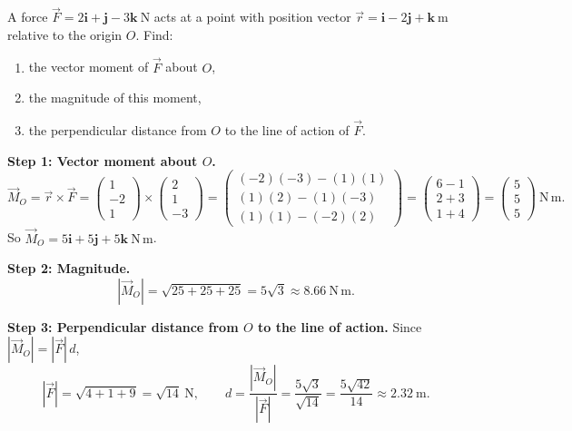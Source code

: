 \documentclass[11pt]{article}
\begin{document}
\begin{exoresolu}
A force $\vec{F} = 2\mathbf{i} + \mathbf{j} - 3\mathbf{k}\ \mathrm{N}$ acts at a point with position vector $\vec{r} = \mathbf{i} - 2\mathbf{j} + \mathbf{k}\ \mathrm{m}$ relative to the origin $O$. Find:
\begin{enumerate}
\item the vector moment of $\vec{F}$ about $O$,
\item the magnitude of this moment,
\item the perpendicular distance from $O$ to the line of action of $\vec{F}$.
\end{enumerate}
\tcblower
\textbf{Step 1: Vector moment about $O$.}
\[
\vec{M}_O = \vec{r} \times \vec{F} =
\begin{pmatrix} 1 \\ -2 \\ 1 \end{pmatrix}
\times
\begin{pmatrix} 2 \\ 1 \\ -3 \end{pmatrix}
=
\begin{pmatrix}
(-2)(-3) - (1)(1) \\
(1)(2) - (1)(-3) \\
(1)(1) - (-2)(2)
\end{pmatrix}
=
\begin{pmatrix}
6 - 1 \\
2 + 3 \\
1 + 4
\end{pmatrix}
=
\begin{pmatrix}
5 \\ 5 \\ 5
\end{pmatrix}\ \mathrm{N\,m}.
\]
So $\vec{M}_O = 5\mathbf{i} + 5\mathbf{j} + 5\mathbf{k}\ \mathrm{N\,m}$.

\textbf{Step 2: Magnitude.}
\[
|\vec{M}_O| = \sqrt{25 + 25 + 25} = 5\sqrt{3} \approx 8.66\ \mathrm{N\,m}.
\]

\textbf{Step 3: Perpendicular distance from $O$ to the line of action.} Since $|\vec{M}_O| = |\vec{F}|\,d$,
\[
|\vec{F}| = \sqrt{4 + 1 + 9} = \sqrt{14}\ \mathrm{N},
\qquad
d = \frac{|\vec{M}_O|}{|\vec{F}|} = \frac{5\sqrt{3}}{\sqrt{14}} = \frac{5\sqrt{42}}{14} \approx 2.32\ \mathrm{m}.
\]


\end{exoresolu}
\end{document}

